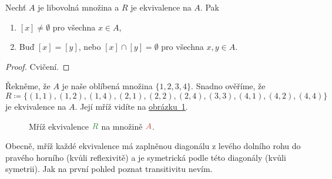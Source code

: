 \begin{claim}
 \label{claim:vlastnosti-trid-ekvivalence}
 Nechť $A$ je libovolná množina a $R$ je ekvivalence na $A$. Pak
 \begin{enumerate}
  \item $[x] \neq \emptyset$ pro všechna $x \in A$,
  \item Buď $[x] = [y]$, nebo $[x] \cap [y] = \emptyset$ pro všechna $x,y \in
   A$.
 \end{enumerate}
\end{claim}
\begin{proof}
 Cvičení.
\end{proof}

\begin{example}
 Řekněme, že $A$ je naše oblíbená množina $\{1,2,3,4\}$. Snadno ověříme, že
 \[
  R \coloneqq \{(1,1),(1,2),(1,4),(2,1),(2,2),(2,4),(3,3),(4,1),(4,2),(4,4)\}
 \]
 je ekvivalence na $A$. Její mříž vidíte na
 \hyperref[fig:mriz-ekvivalence]{obrázku~\ref*{fig:mriz-ekvivalence}}.
 \begin{figure}[H]
  \centering
  \caption{Mříž ekvivalence $\clg{R}$ na množině $\clr{A}$.}
  \label{fig:mriz-ekvivalence}
 \end{figure}
 Obecně, mříž každé ekvivalence má zaplněnou diagonálu z levého dolního rohu do
 pravého horního (kvůli reflexivitě) a je symetrická podle této diagonály (kvůli
 symetrii). Jak na první pohled poznat transitivitu nevím.


\end{example}

